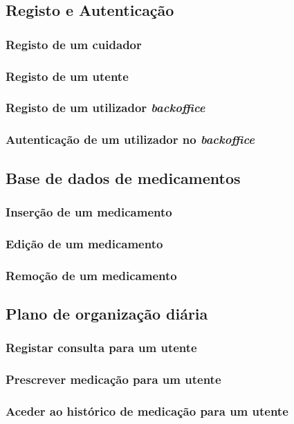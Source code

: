 \subsection{Registo e Autenticação}
\subsubsection{Registo de um cuidador}
\subsubsection{Registo de um utente}
\subsubsection{Registo de um utilizador \textit{backoffice}}
\subsubsection{Autenticação de um utilizador no \textit{backoffice}}
\subsection{Base de dados de medicamentos}
\subsubsection{Inserção de um medicamento}
\subsubsection{Edição de um medicamento}
\subsubsection{Remoção de um medicamento}
\subsection{Plano de organização diária}
\subsubsection{Registar consulta para um utente}
\subsubsection{Prescrever medicação para um utente}
\subsubsection{Aceder ao histórico de medicação para um utente}
